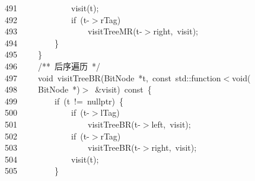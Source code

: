 \documentclass[11pt,a4paper]{ctexart}
\newcommand{\hlstd}[1]{\textcolor[rgb]{0.2,0.2,0.2}{#1}}
\newcommand{\hlcom}[1]{\textcolor[rgb]{0.59,0.59,0.59}{#1}}
\newcommand{\hlopt}[1]{\textcolor[rgb]{0.2,0.2,0.2}{#1}}
\newcommand{\hllin}[1]{\textcolor[rgb]{0.59,0.59,0.59}{#1}}
\newcommand{\hlkwa}[1]{\textcolor[rgb]{0.23,0.42,0.78}{#1}}
\newcommand{\hlkwb}[1]{\textcolor[rgb]{0.63,0,0.31}{#1}}
\newcommand{\hlkwc}[1]{\textcolor[rgb]{0,0.63,0.31}{#1}}
\newcommand{\hlkwd}[1]{\textcolor[rgb]{0.78,0.23,0.41}{#1}}
\begin{document}
\hllin{491\ }\hlstd{}\hlstd{\ \ \ \ \ \ \ \ \ \ \ \ }\hlstd{}\hlkwd{visit}\hlstd{}\hlopt{(}\hlstd{t}\hlopt{);}\\
\hllin{492\ }\hlstd{}\hlstd{\ \ \ \ \ \ \ \ \ \ \ \ }\hlstd{}\hlkwa{if\ }\hlstd{}\hlopt{(}\hlstd{t}\hlopt{{-}$>$}\hlstd{rTag}\hlopt{)}\\
\hllin{493\ }\hlstd{}\hlstd{\ \ \ \ \ \ \ \ \ \ \ \ \ \ \ \ }\hlstd{}\hlkwd{visitTreeMR}\hlstd{}\hlopt{(}\hlstd{t}\hlopt{{-}$>$}\hlstd{right}\hlopt{,\ }\hlstd{visit}\hlopt{);}\\
\hllin{494\ }\hlstd{}\hlstd{\ \ \ \ \ \ \ \ }\hlstd{}\hlopt{\}}\\
\hllin{495\ }\hlstd{}\hlstd{\ \ \ \ }\hlstd{}\hlopt{\}}\\
\hllin{496\ }\hlstd{}\hlstd{\ \ \ \ }\hlstd{}\hlcom{/{*}{*}\ 后序遍历\ {*}/}\hlstd{}\\
\hllin{497\ }\hlstd{}\hlstd{\ \ \ \ }\hlstd{}\hlkwb{void\ }\hlstd{}\hlkwd{visitTreeBR}\hlstd{}\hlopt{(}\hlstd{BitNode\ }\hlopt{{*}}\hlstd{t}\hlopt{,\ }\hlstd{}\hlkwb{const\ }\hlstd{}\hlkwc{std}\hlstd{}\hlopt{::}\hlstd{function}\hlopt{$<$}\hlstd{}\hlkwb{void}\hlstd{}\hlopt{(}\Righttorque\\
\hllin{498\ }\hlstd{}\hlstd{\ \ \ \ }\hlstd{BitNode\ }\hlopt{{*})$>$\ \&}\hlstd{visit}\hlopt{)\ }\hlstd{}\hlkwb{const\ }\hlstd{}\hlopt{\{}\\
\hllin{499\ }\hlstd{}\hlstd{\ \ \ \ \ \ \ \ }\hlstd{}\hlkwa{if\ }\hlstd{}\hlopt{(}\hlstd{t\ }\hlopt{!=\ }\hlstd{}\hlkwc{nullptr}\hlstd{}\hlopt{)\ \{}\\
\hllin{500\ }\hlstd{}\hlstd{\ \ \ \ \ \ \ \ \ \ \ \ }\hlstd{}\hlkwa{if\ }\hlstd{}\hlopt{(}\hlstd{t}\hlopt{{-}$>$}\hlstd{lTag}\hlopt{)}\\
\hllin{501\ }\hlstd{}\hlstd{\ \ \ \ \ \ \ \ \ \ \ \ \ \ \ \ }\hlstd{}\hlkwd{visitTreeBR}\hlstd{}\hlopt{(}\hlstd{t}\hlopt{{-}$>$}\hlstd{left}\hlopt{,\ }\hlstd{visit}\hlopt{);}\\
\hllin{502\ }\hlstd{}\hlstd{\ \ \ \ \ \ \ \ \ \ \ \ }\hlstd{}\hlkwa{if\ }\hlstd{}\hlopt{(}\hlstd{t}\hlopt{{-}$>$}\hlstd{rTag}\hlopt{)}\\
\hllin{503\ }\hlstd{}\hlstd{\ \ \ \ \ \ \ \ \ \ \ \ \ \ \ \ }\hlstd{}\hlkwd{visitTreeBR}\hlstd{}\hlopt{(}\hlstd{t}\hlopt{{-}$>$}\hlstd{right}\hlopt{,\ }\hlstd{visit}\hlopt{);}\\
\hllin{504\ }\hlstd{}\hlstd{\ \ \ \ \ \ \ \ \ \ \ \ }\hlstd{}\hlkwd{visit}\hlstd{}\hlopt{(}\hlstd{t}\hlopt{);}\\
\hllin{505\ }\hlstd{}\hlstd{\ \ \ \ \ \ \ \ }\hlstd{}\hlopt{\}}\\
\end{document}
